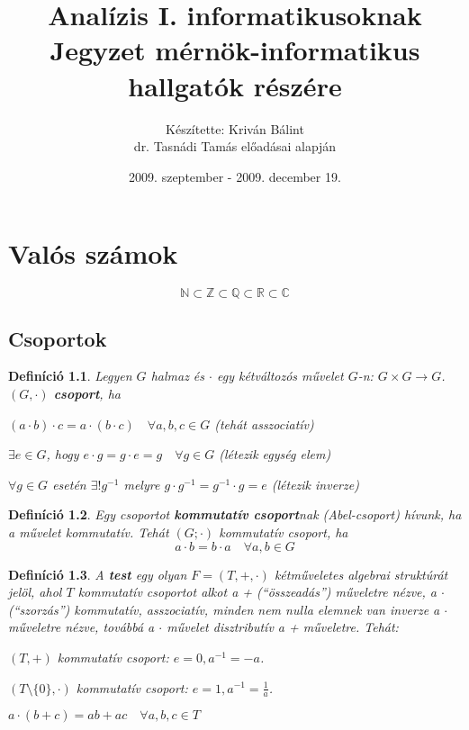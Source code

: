 \documentclass[a4paper,12pt,twoside]{book}
\title{\textbf{Analízis I. informatikusoknak}\\\Large Jegyzet mérnök-informatikus hallgatók részére}
\author{Készítette: Kriván Bálint\\ \normalsize dr. Tasnádi Tamás előadásai alapján}
\date{2009. szeptember - 2009. december 19.}
\newtheorem{defi}{Definíció}[chapter]
\theoremstyle{break}
\theoremstyle{plain}
\begin{document}
\maketitle

\tableofcontents

\chapter{Valós számok}

\[\mathbb{N}\subset\mathbb{Z}\subset\mathbb{Q}\subset\boxed{\mathbb{R}}\subset\mathbb{C}\]

\section{Csoportok}

\begin{defi}
 Legyen $G$ halmaz és $\cdot$ egy kétváltozós művelet $G$-n: $G\times G \to G$.\\
 $(G,\cdot)$ \textbf{csoport}, ha
 \begin{enumerate*}
  \item $(a\cdot b)\cdot c = a\cdot (b\cdot c) \quad \forall a, b, c \in G$ (tehát asszociatív)
  \item $\exists e\in G$, hogy $e\cdot g=g\cdot e = g \quad \forall g\in G$ (létezik egység elem)
  \item $\forall g\in G$ esetén $\exists! g^{-1}$ melyre $g\cdot g^{-1} = g^{-1}\cdot g = e$ (létezik inverze)
 \end{enumerate*}
\end{defi}

\begin{defi}
 Egy csoportot \textbf{kommutatív csoport}nak (Abel-csoport) hívunk, ha a művelet kommutatív. Tehát $(G;\cdot)$ kommutatív csoport, ha
 \[a\cdot b = b\cdot a \quad \forall a, b \in G\]
\end{defi}

\begin{defi}
 A \textbf{test} egy olyan $F = (T, + , \cdot)$ kétműveletes algebrai struktúrát jelöl, ahol $T$ kommutatív csoportot alkot a + (``összeadás'') műveletre nézve, a $\cdot$ (``szorzás'') kommutatív, asszociatív, minden nem nulla elemnek van inverze a $\cdot$ műveletre nézve, továbbá a $\cdot$ művelet disztributív a + műveletre. Tehát:
 \begin{enumerate*}
  \item $(T,+)$ kommutatív csoport: $e=0, a^{-1}=-a$.
  \item $(T\setminus\{0\},\cdot)$ kommutatív csoport: $e=1, a^{-1}=\frac{1}{a}$.
  \item $a\cdot(b+c) = ab+ac \quad \forall a,b,c \in T$
 \end{enumerate*}

\end{defi}
\end{document}
